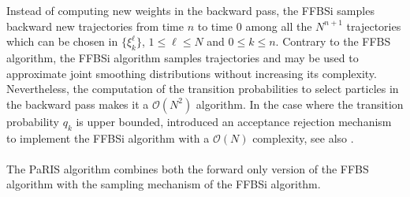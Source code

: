 \documentclass[12pt]{article}
\newcommand{\eqsp}{\;}
\newcommand{\1}{\mathrm{1}}
\begin{document}
Instead of computing new weights in the backward pass, the FFBSi  samples backward new trajectories from time $n$ to time $0$ among all the $N^{n+1}$ trajectories which can be chosen in $\{\xi^{\ell}_k\}$, $1\le \ell\le N$ and $0\le k\le n$. 
Contrary to the FFBS algorithm, the FFBSi algorithm samples trajectories and may be used to approximate joint smoothing distributions without increasing its complexity.
 Nevertheless, the computation of the transition probabilities to select particles in the backward pass makes it a $\mathcal{O}(N^2)$ algorithm. In the case where the transition probability $q_k$ is upper bounded, \cite{douc:garivier:moulines:olsson:2011} introduced an acceptance rejection mechanism to implement the FFBSi algorithm with a $\mathcal{O}(N)$ complexity, see also \cite{dubarry:lecorff:2011}.\\
 \\
The PaRIS algorithm combines both the forward only version of the FFBS algorithm with the sampling mechanism of the FFBSi algorithm. 
\end{document}
